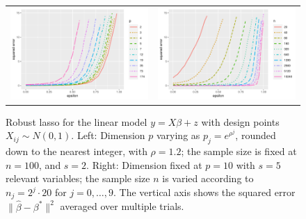 \begin{figure}[t]
\vskip20pt
  \begin{center}
    \begin{tabular}{cc}
      \hskip-10pt
      \includegraphics[width=.48\textwidth]{figures/fig2a}&
      \includegraphics[width=.48\textwidth]{figures/fig2b}\\[-5pt]
    \end{tabular}
  \end{center}
\caption{Robust lasso for the linear model  $y=X\beta + z$ with design points $X_{ij}\sim N(0,1)$.
Left: Dimension $p$ varying as $p_{j} = e^{\rho^j}$, rounded down to the nearest integer, with $\rho=1.2$; the sample size is fixed at $n=100$, and $s=2$. Right: Dimension fixed at $p=10$ with $s=5$ relevant variables; the sample size $n$ is varied according to
$n_j = 2^j \cdot 20$ for $j=0,\ldots, 9$. The vertical axis shows the squared error $\|\hat \beta - \beta^*\|^2$ averaged over multiple trials.}
\label{fig:exp1}
\end{figure}
